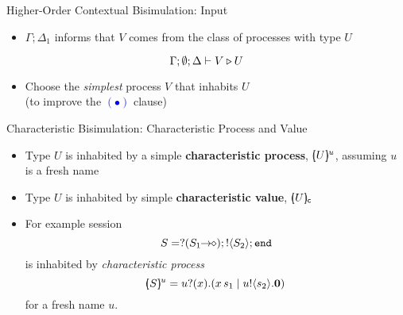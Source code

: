 \documentclass{beamer}
\begin{document}
	\begin{frame}{Higher-Order Contextual Bisimulation: Input}
		\begin{itemize}
			\item	$\Gamma; \Delta_1$ informs that $V$ comes from the class of processes with type $U$
		\end{itemize}
		\[
			\Gamma; \emptyset; \Delta \vdash V \triangleright U
		\]
		\begin{itemize}
			\item	Choose the {\em simplest} process $V$ that inhabits $U$\\
				(to improve the \textcolor{blue}{$(\bullet)$} clause)
		\end{itemize}
	\end{frame}

	\begin{frame}{Characteristic Bisimulation: Characteristic Process and Value}

		\begin{definition}
			\begin{itemize}
				\item	Type $U$ is inhabited by a simple
					{\bf characteristic process}, $[\!\!(U)\!\!]^{u}$,
					assuming $u$ is a fresh name

				\item	Type $U$ is inhabited by simple
					{\bf characteristic value}, $[\!\!(U)\!\!]_{\mathsf{c}}$
			\end{itemize}
		\end{definition}

		\begin{itemize}
			\item	For example session
				\[
					S = ? (S_1\!\! \rightarrow\!\! \diamond) ; ! \langle S_2 \rangle ; \mathtt{end}
				\]
				is inhabited by {\em characteristic process}
				\[
					[\!\!(S)\!\!]^{u} = u ? (x) . (x\, {s_1} \;|\; u ! \langle s_2 \rangle . \mathbf{0})
				\]
				for a fresh name $u$.
		\end{itemize}
%
	\end{frame}
\end{document}
